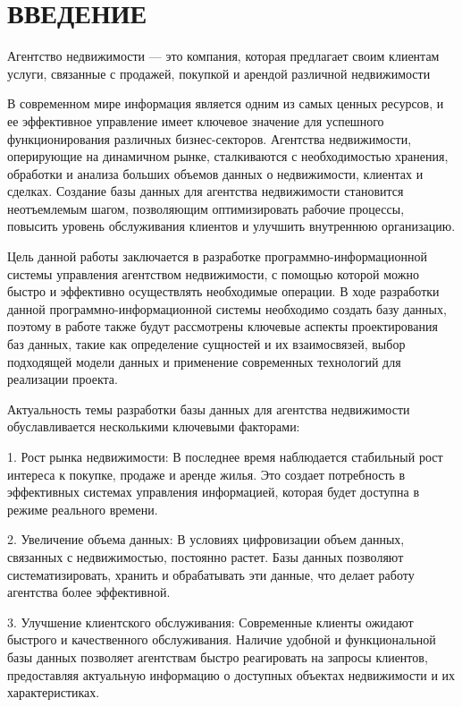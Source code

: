 \section*{ВВЕДЕНИЕ}

Агентство недвижимости — это компания, которая предлагает своим клиентам услуги, связанные с продажей, покупкой и арендой различной недвижимости

В современном мире информация является одним из самых ценных ресурсов, и ее эффективное управление имеет ключевое значение для успешного функционирования различных бизнес-секторов. Агентства недвижимости, оперирующие на динамичном рынке, сталкиваются с необходимостью хранения, обработки и анализа больших объемов данных о недвижимости, клиентах и сделках. Создание базы данных для агентства недвижимости становится неотъемлемым шагом, позволяющим оптимизировать рабочие процессы, повысить уровень обслуживания клиентов и улучшить внутреннюю организацию.

Цель данной работы заключается в разработке программно-информационной системы управления агентством недвижимости, с помощью которой можно быстро и эффективно осуществлять необходимые операции. В ходе разработки данной программно-информационной системы необходимо создать базу данных, поэтому в работе также будут рассмотрены ключевые аспекты проектирования баз данных, такие как определение сущностей и их взаимосвязей, выбор подходящей модели данных и применение современных технологий для реализации проекта.

Актуальность темы разработки базы данных для агентства недвижимости обуславливается несколькими ключевыми факторами:

1. Рост рынка недвижимости: В последнее время наблюдается стабильный рост интереса к покупке, продаже и аренде жилья. Это создает потребность в эффективных системах управления информацией, которая будет доступна в режиме реального времени.

2. Увеличение объема данных: В условиях цифровизации объем данных, связанных с недвижимостью, постоянно растет. Базы данных позволяют систематизировать, хранить и обрабатывать эти данные, что делает работу агентства более эффективной.

3. Улучшение клиентского обслуживания: Современные клиенты ожидают быстрого и качественного обслуживания. Наличие удобной и функциональной базы данных позволяет агентствам быстро реагировать на запросы клиентов, предоставляя актуальную информацию о доступных объектах недвижимости и их характеристиках.

